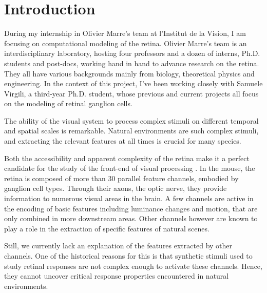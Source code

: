 \section{Introduction}\label{sec:introduction}

During my internship in Olivier Marre's team at l'Institut de la Vision, I am
focusing on computational modeling of the retina. Olivier Marre's team is an
interdisciplinary laboratory, hosting four professors and a dozen of interns,
Ph.D. students and post-docs, working hand in hand to advance research
on the retina. They all have various backgrounds mainly from biology,
theoretical physics and engineering. In the context of this project, I've been
working
closely with Samuele Virgili, a third-year Ph.D. student, whose previous and
current projects all focus on the modeling of retinal ganglion cells.

The ability of the visual system to process complex stimuli on different
temporal and spatial scales is remarkable. %
Natural environments are such complex stimuli, and extracting the relevant
features at all times is crucial for many species.


Both the accessibility and apparent complexity	of the retina make it a
perfect candidate for the study of the front-end of visual processing
\citep{gollisch_eye_2010}. In the mouse, the retina is composed of more
than 30 parallel feature channels, embodied by ganglion cell types. Through
their axons, the optic nerve, they provide information to numerous visual areas
in the brain.
A few channels are active in the encoding of basic features including luminance
changes and motion, that are only combined in more downstream areas. Other
channels however are known to play a role in the extraction of specific
features of natural scenes.

Still, we currently lack an explanation of the features extracted by other
channels. One of the historical reasons for this is that synthetic stimuli used
to study retinal responses are not complex enough to activate these channels.
Hence, they cannot uncover critical response properties encountered in natural
environments. %

